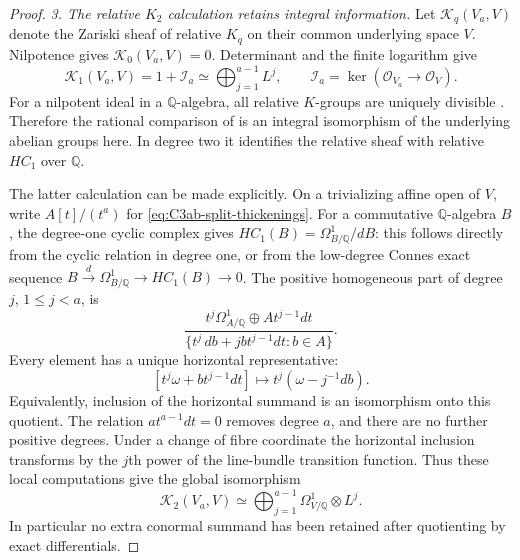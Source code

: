 \begin{proof}
\emph{3. The relative $K_2$ calculation retains integral information.}
Let $\mathcal K_q(V_a,V)$ denote the Zariski sheaf of relative
$K_q$ on their common underlying space $V$. Nilpotence gives
$\mathcal K_0(V_a,V)=0$. Determinant and the finite logarithm give
\[
 \mathcal K_1(V_a,V)=1+\mathcal I_a
       \simeq\bigoplus_{j=1}^{a-1}L^j,
 \qquad \mathcal I_a=\ker(\mathcal O_{V_a}\to\mathcal O_V).
\]
For a nilpotent ideal in a $\mathbb Q$-algebra, all relative
$K$-groups are uniquely divisible
\citep[Consequence 1.4, p.~392]{D_Weibel1982}.
Therefore the rational comparison of
\citet[Main Theorem, p.~348]{D_Goodwillie1986}
is an integral isomorphism of the underlying abelian groups here.
In degree two it identifies the relative sheaf with relative
$HC_1$ over $\mathbb Q$.

The latter calculation can be made explicitly. On a trivializing
affine open of $V$, write $A[t]/(t^a)$ for
\eqref{eq:C3ab-split-thickenings}. For a commutative
$\mathbb Q$-algebra $B$, the degree-one cyclic complex gives
$HC_1(B)=\Omega^1_{B/\mathbb Q}/dB$: this follows directly from
the cyclic relation in degree one, or from the low-degree
Connes exact sequence $B\xrightarrow{d}\Omega^1_{B/\mathbb Q}
\to HC_1(B)\to0$.
The positive homogeneous part of degree $j$, $1\le j<a$, is
\[
 \frac{t^j\Omega^1_{A/\mathbb Q}\oplus
                 A t^{j-1}dt}
      {\{t^j\,db+j b t^{j-1}dt:b\in A\}}.
\]
Every element has a unique horizontal representative:
\[
 [t^j\omega+b t^{j-1}dt]
          \longmapsto t^j(\omega-j^{-1}db).
\]
Equivalently, inclusion of the horizontal summand is an
isomorphism onto this quotient. The relation
$a t^{a-1}dt=0$ removes degree $a$, and there are no further
positive degrees. Under a change of fibre coordinate the
horizontal inclusion transforms by the $j$th power of the
line-bundle transition function. Thus these local computations
give the global isomorphism
\begin{equation}\label{eq:C3ab-relative-K2}
 \mathcal K_2(V_a,V)\simeq
       \bigoplus_{j=1}^{a-1}
                      \Omega^1_{V/\mathbb Q}\otimes L^j.
\end{equation}
In particular no extra conormal summand has been retained after
quotienting by exact differentials.


\end{proof}
